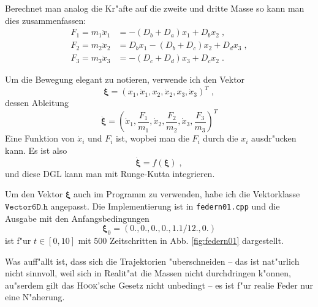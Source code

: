 \documentclass[a4paper,12pt]{article}
\renewcommand{\vec}[1]{\ensuremath{\boldsymbol{#1}}}
\begin{document}
Berechnet man analog die Kr"afte auf die zweite und dritte Masse so
kann man dies zusammenfassen:
\begin{align}
  \label{eq:2}
  F_1 = m_1 \ddot x_1 &= -(D_b+D_a) x_1 + D_b x_2 \;, \\
  F_2 = m_2 \ddot x_2 &= D_b x_1 - (D_b+D_c)x_2 + D_dx_3 \;, \\
  F_3 = m_3 \ddot x_3 &= -(D_c + D_d)x_3 + D_c x_2 \;.
\end{align}

Um die Bewegung elegant zu notieren, verwende ich den Vektor
\begin{equation}
  \label{eq:3}
  \vec \xi = (x_1, \dot x_1, x_2, \dot x_2, x_3 , \dot x_3 )^T \;,
\end{equation}
dessen Ableitung
\begin{equation}
  \label{eq:4}
  \dot{ \vec \xi } = ( \dot x_1, \frac{F_1}{m_1},  \dot x_2,
    \frac{F_2}{m_2},  \dot x_3, \frac{F_3}{m_3} )^T
\end{equation}
Eine Funktion von $\dot x_i$ und $F_i$ ist, wopbei man die $F_i$ durch
die $x_i$ ausdr"ucken kann. Es ist also
\begin{equation}
  \label{eq:5}
  \dot{ \vec \xi } = f( \vec \xi ) \;,
\end{equation}
und diese DGL kann man mit Runge-Kutta integrieren.

Um den Vektor $\vec \xi$ auch im Programm zu verwenden, habe ich die
Vektorklasse $\texttt{Vector6D.h}$ angepasst. Die Implementierung ist
in \texttt{federn01.cpp} und die Ausgabe mit den Anfangsbedingungen
\begin{equation}
  \label{eq:6}
  \vec \xi_0 = ( 0., 0., 0., 0., 1.1/12., 0. )
\end{equation}
ist f"ur $t \in [ 0 , 10 ]$ mit 500 Zeitschritten in
Abb. \ref{fig:federn01} dargestellt.

Was auff"allt ist, dass sich die Trajektorien "uberschneiden -- das
ist nat"urlich nicht sinnvoll, weil sich in Realit"at die Massen nicht
durchdringen k"onnen, au"serdem gilt das \textsc{Hook}'sche Gesetz
nicht unbedingt -- es ist f"ur realie Feder nur eine N"aherung.
\end{document}
